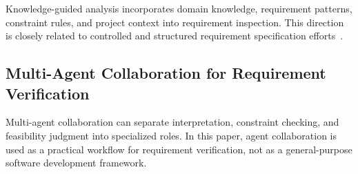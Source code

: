 Knowledge-guided analysis incorporates domain knowledge, requirement patterns, constraint rules, and project context into requirement inspection.
This direction is closely related to controlled and structured requirement specification efforts~\cite{darifControlledNaturalLanguage2026}.

\subsection{Multi-Agent Collaboration for Requirement Verification}
\label{rw:multi_agent}

Multi-agent collaboration can separate interpretation, constraint checking, and feasibility judgment into specialized roles.
In this paper, agent collaboration is used as a practical workflow for requirement verification, not as a general-purpose software development framework.
